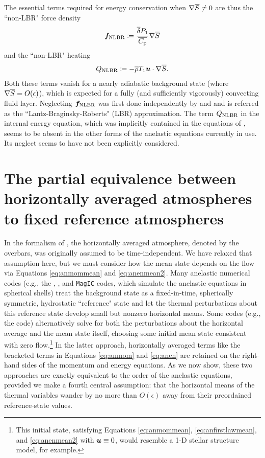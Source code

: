 \documentclass[12pt]{article}
\begin{document}
The essential terms required for energy conservation when $\nabla\overline{S}\neq0$ are thus the ``non-LBR" force density
\begin{align}\label{eq:nlbrmom}
	\bm{f}_{\rm NLBR} \coloneqq \frac{\overline{\delta} P_1}{\overline{C_{\rm{p}}}} \nabla\overline{S}
\end{align}
and the ``non-LBR" heating
\begin{align}\label{eq:nlbrheat}
	Q_{\rm NLBR} \coloneqq -\overline{\rho} T_1\bm{u}\cdot\nabla\overline{S}.
\end{align}
Both these terms vanish for a nearly adiabatic background state (where $\nabla\overline{S}=O(\epsilon)$), which is expected for a fully (and sufficiently vigorously) convecting fluid layer.  Neglecting $\bm{f}_{\rm NLBR}$ was first done independently by \citet{Lantz1992} and \citet{Braginsky1995} and is referred as the ``Lantz-Braginsky-Roberts" (LBR) approximation. The term $Q_{\rm NLBR}$ in the internal energy equation, which was implicitly contained in the equations of \citet{Gough1969}, seems to be absent in the other forms of the anelastic equations currently in use. Its neglect seems to have not been explicitly considered. 

\section{The partial equivalence between horizontally averaged atmospheres to fixed reference atmospheres}\label{sec:meantoref}
In the formalism of \citet{Gough1969}, the horizontally averaged atmosphere, denoted by the overbars, was originally assumed to be time-independent. We have relaxed that assumption here, but we must consider how the mean state depends on the flow via Equations \eqref{eq:anmommean} and \eqref{eq:anenmean2}. Many anelastic numerical codes (e.g., the {\rayleigh}, {\eulag}, and \texttt{MagIC} codes, which simulate the anelastic equations in spherical shells) treat the background state as a fixed-in-time, spherically symmetric, hydrostatic ``reference" state and let the thermal perturbations about this reference state develop small but nonzero horizontal means. Some codes (e.g., the {\ash} code) alternatively solve for both the perturbations about the horizontal average and the mean state itself, choosing some initial mean state consistent with zero flow.\footnote{This initial state, satisfying Equations \eqref{eq:anmommean}, \eqref{eq:anfirstlawmean}, and \eqref{eq:anenmean2} with $\bm{u}\equiv0$, would resemble a 1-D stellar structure model, for example.} In the latter approach, horizontally averaged terms like the bracketed terms in Equations \eqref{eq:anmom} and \eqref{eq:anen} are retained on the right-hand sides of the momentum and energy equations. As we now show, these two approaches are exactly equivalent to the order of the anelastic equations, provided we make a fourth central assumption: that the horizontal means of the thermal variables wander by no more than $O(\epsilon)$ away from their preordained reference-state values. 
\end{document}
